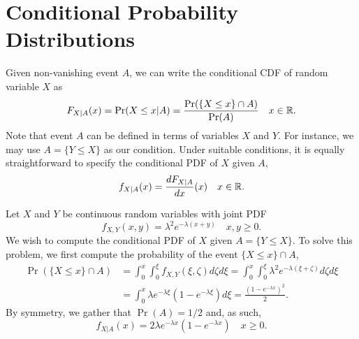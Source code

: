 \section{Conditional Probability Distributions}

Given non-vanishing event $A$, we can write the conditional CDF of random variable $X$ as
\begin{equation*}
F_{X|A} (x) = \Pr (X \leq x | A)
= \frac{ \Pr ( \{ X \leq x \} \cap A ) }{\Pr(A)} \quad x \in \mathbb{R} .
\end{equation*}
Note that event $A$ can be defined in terms of variables $X$ and $Y$.
For instance, we may use $A = \{ Y \leq X \}$ as our condition.
Under suitable conditions, it is equally straightforward to specify the conditional PDF of $X$ given $A$,
\begin{equation*}
f_{X|A} (x) = \frac{d F_{X|A}}{dx} (x) \quad x \in \mathbb{R} .
\end{equation*}

\begin{example}
Let $X$ and $Y$ be continuous random variables with joint PDF
\begin{equation*}
f_{X,Y} (x,y) = \lambda^2 e^{-\lambda (x + y)} \quad x,y \geq 0 .
\end{equation*}
We wish to compute the conditional PDF of $X$ given $A = \{ Y \leq X \}$.
To solve this problem, we first compute the probability of the event $\{ X \leq x \} \cap A$,
\begin{equation*}
\begin{split}
\Pr ( \{ X \leq x \} \cap A )
&= \int_0^x \int_0^{\xi} f_{X,Y} (\xi, \zeta) d\zeta d\xi
= \int_0^x \int_0^{\xi} \lambda^2 e^{-\lambda (\xi + \zeta)} d\zeta d\xi \\
&= \int_0^x \lambda e^{- \lambda \xi} \left( 1 - e^{- \lambda \xi} \right) d\xi
= \frac{ \left( 1 - e^{-\lambda x} \right)^2 }{2} .
\end{split}
\end{equation*}
By symmetry, we gather that $\Pr(A) = 1/2$ and, as such,
\begin{equation*}
f_{X | A} (x) = 2 \lambda e^{-\lambda x} \left( 1 - e^{-\lambda x} \right)
\quad x \geq 0 .
\end{equation*}
\end{example}

